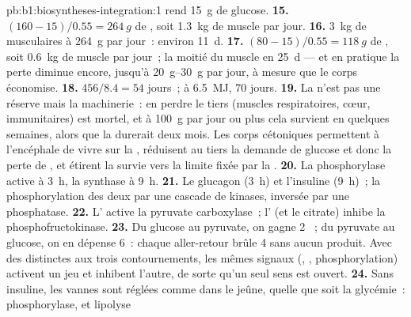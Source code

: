 \begin{solution}{pb:b1:biosyntheses-integration:1}
rend \qty{15}{g} de glucose.
\textbf{15.} $(160 - 15)/0.55 = \qty{264}{g}$ de , soit
\qty{1.3}{kg} de muscle par jour.
\textbf{16.} \qty{3}{kg} de  musculaires à \qty{264}{g} par
jour~: environ \qty{11}{d}.
\textbf{17.} $(80 - 15)/0.55 = \qty{118}{g}$ de , soit
\qty{0.6}{kg} de muscle par jour~; la moitié du muscle en \qty{25}{d}
--- et en pratique la perte diminue encore, jusqu'à
\qtyrange{20}{30}{g} par jour, à mesure que le corps économise.
\textbf{18.} $456/8.4 = 54$ jours~; à \qty{6.5}{MJ}, 70 jours.
\textbf{19.} La  n'est pas une réserve mais la machinerie~: en
perdre le tiers (muscles respiratoires, cœur,  immunitaires)
est mortel, et à \qty{100}{g} par jour ou plus cela survient en
quelques semaines, alors que la  durerait deux mois. Les corps
cétoniques permettent à l'encéphale de vivre sur la , réduisent
au tiers la demande de glucose et donc la perte de , et
étirent la survie vers la limite fixée par la .
\textbf{20.} La  phosphorylase active à 3~h, la 
synthase à 9~h.
\textbf{21.} Le glucagon (3~h) et l'insuline (9~h)~; la phosphorylation
des deux  par une cascade de kinases, inversée par une
phosphatase.
\textbf{22.} L' active la pyruvate carboxylase~; l' (et le
citrate) inhibe la phosphofructokinase.
\textbf{23.} Du glucose au pyruvate, on gagne 2 ~; du pyruvate au
glucose, on en dépense 6~: chaque aller-retour brûle 4  sans aucun
produit. Avec des  distinctes aux trois contournements, les mêmes
signaux (, , phosphorylation) activent un jeu et inhibent
l'autre, de sorte qu'un seul sens est ouvert.
\textbf{24.} Sans insuline, les vannes sont réglées comme dans le jeûne,
quelle que soit la glycémie~: phosphorylase,  et lipolyse

\end{solution}
